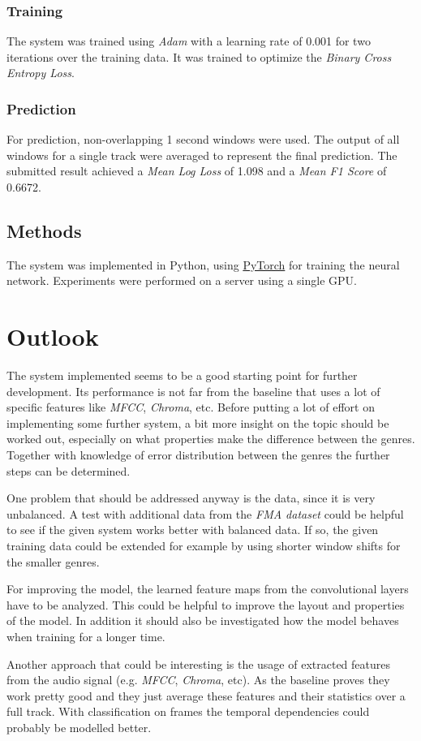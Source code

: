 \documentclass[11pt, twocolumn]{article}
\begin{document}
\subsubsection{Training}
The system was trained using \textit{Adam} with a learning rate of 0.001 for two iterations over the training data. It was trained to optimize the \textit{Binary Cross Entropy Loss}.

\subsubsection{Prediction}
For prediction, non-overlapping 1 second windows were used. The output of all windows for a single track were averaged to represent the final prediction. The submitted result achieved a \textit{Mean Log Loss} of 1.098 and a \textit{Mean F1 Score} of 0.6672.

\subsection{Methods}
The system was implemented in Python, using \href{http://pytorch.org/}{PyTorch} for training the neural network. Experiments were performed on a server using a single GPU. 

\section{Outlook}
The system implemented seems to be a good starting point for further development. Its performance is not far from the baseline that uses a lot of specific features like \textit{MFCC}, \textit{Chroma}, etc. Before putting a lot of effort on implementing some further system, a bit more insight on the topic should be worked out, especially on what properties make the difference between the genres. Together with knowledge of error distribution between the genres the further steps can be determined. 

One problem that should be addressed anyway is the data, since it is very unbalanced. A test with additional data from the \textit{FMA dataset} could be helpful to see if the given system works better with balanced data. If so, the given training data could be extended for example by using shorter window shifts for the smaller genres.

For improving the model, the learned feature maps from the convolutional layers have to be analyzed. This could be helpful to improve the layout and properties of the model. In addition it should also be investigated how the model behaves when training for a longer time.

Another approach that could be interesting is the usage of extracted features from the audio signal (e.g. \textit{MFCC}, \textit{Chroma}, etc). As the baseline proves they work pretty good and they just average these features and their statistics over a full track. With classification on frames the temporal dependencies could probably be modelled better.



\end{document}
